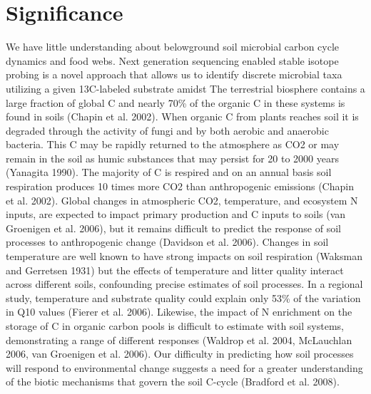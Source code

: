 \section{Significance} 
We have little understanding about belowground soil microbial carbon cycle dynamics and food webs. Next generation sequencing enabled stable isotope probing is a novel approach that allows us to identify discrete microbial taxa utilizing a given 13C-labeled substrate amidst  
The terrestrial biosphere contains a large fraction of global C and nearly 70\% of the organic C in these systems is found in soils (Chapin et al. 2002). When organic C from plants reaches soil it is degraded through the activity of fungi and by both aerobic and anaerobic bacteria. This C may be rapidly returned to the atmosphere as CO2 or may remain in the soil as humic substances that may persist for 20 to 2000 years (Yanagita 1990). The majority of C is respired and on an annual basis soil respiration produces 10 times more CO2 than anthropogenic emissions (Chapin et al. 2002). Global changes in atmospheric CO2, temperature, and ecosystem N inputs, are expected to impact primary production and C inputs to soils (van Groenigen et al. 2006), but it remains difficult to predict the response of soil processes to anthropogenic change (Davidson et al. 2006). Changes in soil temperature are well known to have strong impacts on soil respiration (Waksman and Gerretsen 1931) but the effects of temperature and litter quality interact across different soils, confounding precise estimates of soil processes. In a regional study, temperature and substrate quality could explain only 53\% of the variation in Q10 values (Fierer et al. 2006). Likewise, the impact of N enrichment on the storage of C in organic carbon pools is difficult to estimate with soil systems, demonstrating a range of different responses (Waldrop et al. 2004, McLauchlan 2006, van Groenigen et al. 2006). Our difficulty in predicting how soil processes will respond to environmental change suggests a need for a greater understanding of the biotic mechanisms that govern the soil C-cycle (Bradford et al. 2008).